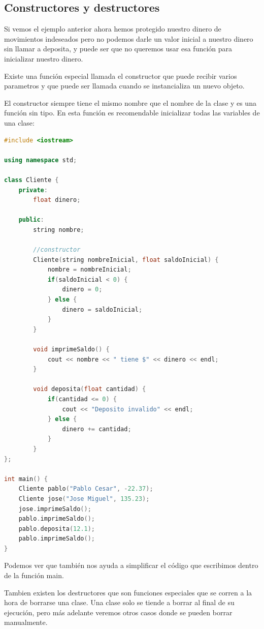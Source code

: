 \documentclass{article}
\begin{document}
\subsection{Constructores y destructores}

Si vemos el ejemplo anterior ahora hemos protegido nuestro dinero de movimientos indeseados pero no podemos darle un valor inicial a nuestro dinero sin llamar a deposita, y puede ser que no queremos usar esa función para inicializar nuestro dinero.

Existe una función especial llamada el constructor que puede recibir varios parametros y que puede ser llamada cuando se instancializa un nuevo objeto.

El constructor siempre tiene el mismo nombre que el nombre de la clase y es una función sin tipo. En esta función es recomendable inicializar todas las variables de una clase:

\begin{lstlisting}[language=C++, caption=Constructores]
#include <iostream>

using namespace std;

class Cliente {
    private:
        float dinero;

    public:
        string nombre;

        //constructor
        Cliente(string nombreInicial, float saldoInicial) {
            nombre = nombreInicial;
            if(saldoInicial < 0) {
                dinero = 0;
            } else {
                dinero = saldoInicial;
            }
        }

        void imprimeSaldo() {
            cout << nombre << " tiene $" << dinero << endl;
        }

        void deposita(float cantidad) {
            if(cantidad <= 0) {
                cout << "Deposito invalido" << endl;
            } else {
                dinero += cantidad;
            }
        }
};

int main() {
    Cliente pablo("Pablo Cesar", -22.37);
    Cliente jose("Jose Miguel", 135.23);
    jose.imprimeSaldo();
    pablo.imprimeSaldo();
    pablo.deposita(12.1);
    pablo.imprimeSaldo();
}
\end{lstlisting}

Podemos ver que también nos ayuda a simplificar el código que escribimos dentro de la función main.

Tambien existen los destructores que son funciones especiales que se corren a la hora de borrarse una clase. Una clase solo se tiende a borrar al final de su ejecución, pero más adelante veremos otros casos donde se pueden borrar manualmente.
\end{document}
